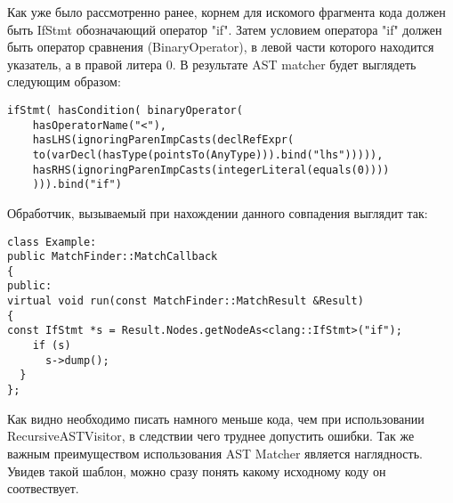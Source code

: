 Как уже было рассмотренно ранее, корнем для искомого фрагмента кода должен быть IfStmt обозначающий
оператор "if". Затем условием оператора "if" должен быть оператор сравнения (BinaryOperator), 
в левой части которого находится указатель, а в правой литера 0. В результате AST matcher будет
выглядеть следующим образом: 
\begin{lstlisting}
ifStmt( hasCondition( binaryOperator(
	hasOperatorName("<"),
	hasLHS(ignoringParenImpCasts(declRefExpr(
    to(varDecl(hasType(pointsTo(AnyType))).bind("lhs"))))),
    hasRHS(ignoringParenImpCasts(integerLiteral(equals(0))))
    ))).bind("if")
\end{lstlisting}

Обработчик, вызываемый при нахождении данного совпадения выглядит так:
\begin{lstlisting}
class Example:
public MatchFinder::MatchCallback 
{
public:
virtual void run(const MatchFinder::MatchResult &Result) 
{
const IfStmt *s = Result.Nodes.getNodeAs<clang::IfStmt>("if");
    if (s)
      s->dump();
  }
};
\end{lstlisting}

Как видно необходимо писать намного меньше кода, чем при использовании RecursiveASTVisitor,
в следствии чего труднее допустить ошибки. Так же важным преимуществом использования AST Matcher
является наглядность. Увидев такой шаблон, можно сразу понять какому исходному коду он соотвествует. 